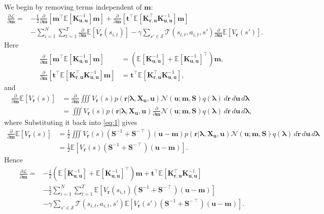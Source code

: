 \documentclass{article}
\theoremstyle{definition}
\theoremstyle{remark}
\newcommand{\Kuu}{\mathbf{K}_{\mathbf{u},\mathbf{u}}}
\newcommand{\Kru}{\mathbf{K}_{\mathbf{r},\mathbf{u}}}
\newcommand{\dm}{\frac{\partial}{\partial\mathbf{m}}}
\begin{document}
We begin by removing terms independent of $\mathbf{m}$:
\[
  \begin{split}
    \frac{\partial\mathcal{L}}{\partial\mathbf{m}} =
    &- \frac{1}{2}\dm[\mathbf{m}^\intercal\mathbb{E}[\Kuu^{-1}]\mathbf{m}]
    + \dm[\mathbf{t}^\intercal\mathbb{E}[\Kru^\intercal\Kuu^{-1}]\mathbf{m}] \\
    &- \sum_{i=1}^N \sum_{t=1}^T \dm\mathbb{E}[V_{\mathbf{r}}(s_{i,t})] -
      \gamma\sum_{s' \in \mathcal{S}} \mathcal{T}(s_{i,t}, a_{i,t},
      s')\dm\mathbb{E}[V_{\mathbf{r}}(s')].
  \end{split}
\]
Here
\begin{align*}
  \dm[\mathbf{m}^\intercal\mathbb{E}[\Kuu^{-1}]\mathbf{m}] &= (\mathbb{E}[\Kuu^{-1}] + \mathbb{E}[\Kuu^{-1}]^\intercal)\mathbf{m}, \\
  \dm[\mathbf{t}^\intercal\mathbb{E}[\Kru^\intercal\Kuu^{-1}]\mathbf{m}] &= \mathbf{t}^\intercal\mathbb{E}[\Kru^\intercal\Kuu^{-1}],
\end{align*}
and
\begin{equation} \label{eq:1}
  \begin{split}
    \dm\mathbb{E}[V_{\mathbf{r}}(s)] &= \dm\iiint V_{\mathbf{r}}(s) p(\mathbf{r} | \bm\lambda,
    \mathbf{X_u}, \mathbf{u}) \mathcal{N}(\mathbf{u}; \mathbf{m}, \mathbf{S})
    q(\bm\lambda)\,d\mathbf{r}\,d\mathbf{u}\,d\bm\lambda \\
    &= \iiint V_{\mathbf{r}}(s) p(\mathbf{r} | \bm\lambda,
    \mathbf{X_u}, \mathbf{u}) \dm\mathcal{N}(\mathbf{u}; \mathbf{m}, \mathbf{S})
    q(\bm\lambda)\,d\mathbf{r}\,d\mathbf{u}\,d\bm\lambda,
  \end{split}
\end{equation}
where
Substituting it back into \eqref{eq:1} gives
\[
  \begin{split}
    \dm\mathbb{E}[V_{\mathbf{r}}(s)] &= \frac{1}{2}\iiint V_{\mathbf{r}}(s)
    (\mathbf{S}^{-1} + \mathbf{S}^{-\intercal})(\mathbf{u} - \mathbf{m})
    p(\mathbf{r} | \bm\lambda, \mathbf{X_u}, \mathbf{u}) \mathcal{N}(\mathbf{u};
    \mathbf{m}, \mathbf{S})
    q(\bm\lambda)\,d\mathbf{r}\,d\mathbf{u}\,d\bm\lambda \\
    &= \frac{1}{2}\mathbb{E}[V_{\mathbf{r}}(s) (\mathbf{S}^{-1} +
    \mathbf{S}^{-\intercal})(\mathbf{u} - \mathbf{m})].
\end{split}
\]
Hence
\[
  \begin{split}
    \frac{\partial\mathcal{L}}{\partial\mathbf{m}} =
    &-\frac{1}{2}(\mathbb{E}[\Kuu^{-1}] +
    \mathbb{E}[\Kuu^{-1}]^\intercal)\mathbf{m} +
    \mathbf{t}^\intercal\mathbb{E}[\Kru^\intercal\Kuu^{-1}] \\
    &- \frac{1}{2}\sum_{i=1}^N\sum_{t=1}^T \mathbb{E}[V_{\mathbf{r}}(s_{i,t})
    (\mathbf{S}^{-1} + \mathbf{S}^{-\intercal})(\mathbf{u} - \mathbf{m})] \\
    &- \gamma\sum_{s' \in \mathcal{S}} \mathcal{T}(s_{i,t}, a_{i,t}, s')
    \mathbb{E}[V_{\mathbf{r}}(s') (\mathbf{S}^{-1} + \mathbf{S}^{-\intercal})(\mathbf{u} -
    \mathbf{m})].
\end{split}
\]
\end{document}
